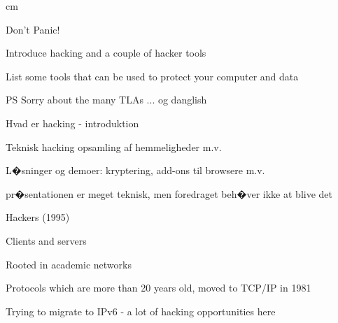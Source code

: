 \documentclass[20pt,landscape,a4paper,footrule]{foils}
\begin{document}


 cm


\centerline{\color{titlecolor}\LARGE Don't Panic!}

\begin{list1}
\item Introduce hacking and a couple of hacker tools
\item List some tools that can be used to protect your computer and data
\item PS Sorry about the many TLAs ... og danglish
\end{list1}



\begin{list1}
\item Hvad er hacking - introduktion
\item Teknisk hacking opsamling af hemmeligheder m.v.
\item L�sninger og demoer: kryptering, add-ons til browsere m.v.
\end{list1}

pr�sentationen er meget teknisk, men foredraget beh�ver ikke at blive det \smiley




\centerline{ Hackers (1995)}




\begin{list1}
\item Clients and servers
\item Rooted in academic networks
\item Protocols which are more than 20 years old, moved to TCP/IP in 1981
\item Trying to migrate to IPv6 - a lot of hacking opportunities here
\end{list1}
\end{document}
